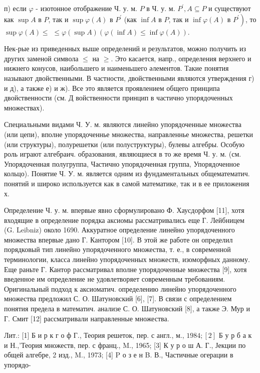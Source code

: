 \documentclass[10pt]{article}
\begin{document}
п) если $\varphi$ - изотонное отображение Ч. у. м. $P$ в Ч. у. м. $P^{\prime}, A \subseteq P$ и существуют как $\sup A$ в $P$, так и $\sup \varphi(A)$ в $P^{\prime}$ (как $\inf A$ в $P$, так и $\inf \varphi(A)$ в $\left.P^{\prime}\right)$, то $\sup \varphi(A) \leqslant$ $\leqslant \varphi(\sup A)(\varphi(\inf A) \leqslant \inf \varphi(A))$.



Нек-рые из приведенных выше определений и результатов, можно получить из других заменой символа $\leqslant$ на $\geqslant$. Это касается, напр., определения верхнего и нижнего конусов, наибольшего и наименьшего әлементов. Такие понятия называют двойственными. В частности, двойственными являются утверждения г) и д), а также е) и ж). Все это является проявлением общего принципа двойственности (см. Д войственности принцип в частично упорядоченных множествах).



Специальными видами Ч. У. м. являются линейно упорядоченные множества (или цепи), вполне упорядоченнье множества, направленнье множества, решетки (или структуры), полурешетки (или полуструктуры), булевы алгебры. Особую роль играют алгебраич. образования, являющиеся в то же время Ч. у. м. (см. Упорядоченная полугруппа, Частично упорядоченная группа, Упорядоченное кольцо). Понятие Ч. У. м. является одним из фундаментальных общематематич. понятий и широко используется как в самой математике, так и в ее приложения х.



Определение Ч. у. м. впервые явно сформулировано Ф. Хаусдорфом [11], хотя входящие в определение порядка аксиомы рассматривались еще Г. Лейбницем (G. Leibniz) около 1690. Аккуратное определение линейно упорядоченного множества впервые дано Г. Кантором [10]. В этой же работе он определил порядковый тип линейно упорядоченного множества, т. е., в современной терминологии, класса линейно упорядоченных множеств, изоморфных данному. Еще раньте Г. Кантор рассматривал вполне упорядоченные множества [9], хотя введенное им определение не удовлетворяет современным требованиям. Оригинальный подход к аксиоматич. определению линейно упорядоченного множества предложил С. О. Шатуновский [6], [7]. В связи с определением понятия предела в математич. анализе С. О. Шатуновский [8], а также Э. Мур и Г. Смит [12] рассматривали направленные множества.



Лит.: [1] Б и р к г о ф Г., Теория решеток, пер. с англ., м., $1984 ;[2]$ Б у р б а к и Н.,'Теория множеств, пер. с франц., M., 1965; [3] К у р о ш А. Г., Јекции по общей алгебре, 2 изд., M., 1973; [4] P о з е н B. В., Частичные огерации в упорядо-
\end{document}
